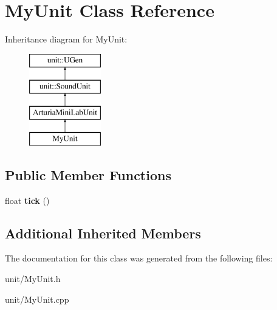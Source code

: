 \hypertarget{classMyUnit}{}\section{My\+Unit Class Reference}
\label{classMyUnit}
Inheritance diagram for My\+Unit\+:\begin{figure}[H]
\begin{center}
\leavevmode
\includegraphics[height=4.000000cm]{classMyUnit}
\end{center}
\end{figure}
\subsection*{Public Member Functions}
\begin{DoxyCompactItemize}
\item 
float {\bfseries tick} ()\hypertarget{classMyUnit_a953579dd3e7fd08821f52c957227b6dc}{}\label{classMyUnit_a953579dd3e7fd08821f52c957227b6dc}

\end{DoxyCompactItemize}
\subsection*{Additional Inherited Members}


The documentation for this class was generated from the following files\+:\begin{DoxyCompactItemize}
\item 
unit/My\+Unit.\+h\item 
unit/My\+Unit.\+cpp\end{DoxyCompactItemize}
